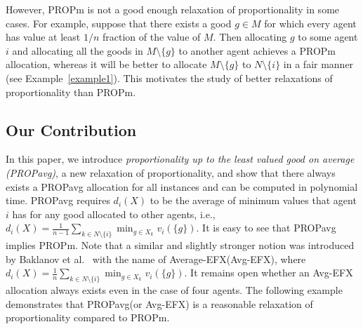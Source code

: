 \documentclass[11pt]{article}
\newcommand{\PROPavg}{\textsf{PROPavg}\xspace}
\newcommand{\PROPm}{\textsf{PROPm}\xspace}
\newcommand{\EFX}{\textsf{EFX}\xspace}
\begin{document}
However, \PROPm is not a good enough relaxation of proportionality in some cases. 
For example, suppose that there exists a good $g\in M$ for which every agent has value at least $1/n$ fraction of the value of $M$. 
Then allocating $g$ to some agent $i$ and allocating all the goods in $M\setminus \{g\}$ to another agent achieves a \PROPm allocation, 
whereas it will be better to allocate $M\setminus \{g\}$ to $N \setminus \{i\}$ in a fair manner (see Example~\ref{example1}). 
This motivates the study of better relaxations of proportionality than \PROPm.



\subsection{Our Contribution}
\label{sec: results}


In this paper, we introduce {\it proportionality up to the least valued good on average (\PROPavg)}, a new relaxation of proportionality, and show that there always exists a \PROPavg allocation for all instances and can be computed in polynomial time.
\PROPavg requires $d_i(X)$ to be the average of minimum values that agent $i$ has for any good allocated to other agents, i.e., $d_i(X)=\frac{1}{n-1}\sum_{k\in N\setminus \{i\}} \min_{g\in X_k} v_i(\{g\})$.
It is easy to see that \PROPavg implies \PROPm.
Note that a similar and slightly stronger notion was introduced by Baklanov et al.~\cite{baklanov2021achieving} with the name of Average-\EFX (\textsf{Avg-EFX}), 
where $d_i(X)=\frac{1}{n}\sum_{k\in N\setminus \{i\}} \min_{g\in X_k} v_i(\{g\})$. 
It remains open whether an \textsf{Avg-EFX} allocation always exists even in the case of four agents. 
The following example demonstrates that \PROPavg (or \textsf{Avg-EFX}) is a reasonable relaxation of proportionality compared to \PROPm. 
\end{document}
